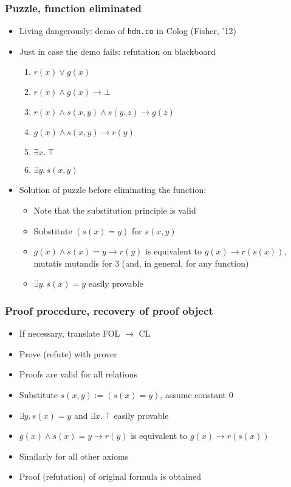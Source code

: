 \documentclass[handout,11pt]{beamer}
\newcommand{\imp}{\rightarrow}
\begin{document}
\begin{frame}
\frametitle{Puzzle, function eliminated}
 \begin{itemize}[<+->]
    \item Living dangerously: demo of {\tt hdn.co} in Colog (Fisher, '12)
    \item Just in case the demo fails: refutation on blackboard
    \begin{enumerate}
      \item $r(x) \vee g(x)$ 
      \item $r(x) \wedge g(x) \imp \bot$
      \item $r(x) \wedge s(x,y) \wedge s(y,z) \imp g(z)$ 
      \item $g(x) \wedge s(x,y) \imp r(y)$    
      \item $\exists x.~\top$
      \item $\exists y.\,s(x,y)$
  \end{enumerate}
  \item Solution of puzzle before eliminating 
  the function:
    \begin{itemize}
    \item Note that the substitution principle is valid
    \item Substitute $(s(x) = y)$ for $s(x,y)$   
    \item $g(x) \wedge s(x)=y \imp r(y)$ is equivalent to $g(x) \imp r(s(x))$,
    mutatis mutandis for 3 (and, in general, for any function)
    \item $\exists y.\,s(x)=y$ easily provable
    \end{itemize}
  \end{itemize}
\end{frame}

\begin{frame}
\frametitle{Proof procedure, recovery of proof object}
 \begin{itemize}[<+->]
    \item If necessary, translate FOL $\rightarrow$ CL
    \item Prove (refute) with prover
    \item Proofs are valid for all relations %
    \item Substitute $s(x,y) := (s(x) = y)$, assume constant $0$
    \item $\exists y.\,s(x)=y$ and $\exists x.~\top$ easily provable
    \item $g(x) \wedge s(x)=y \imp r(y)$ is equivalent to $g(x) \imp r(s(x))$
    \item Similarly for all other axioms
    \item Proof (refutation) of original formula is obtained
 \end{itemize}
\end{frame}
\end{document}
